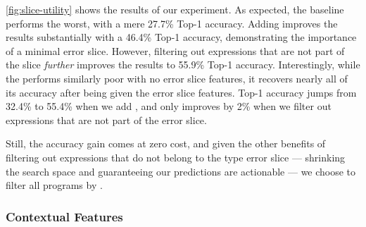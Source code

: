 \autoref{fig:slice-utility} shows the results of our experiment.
%
As expected, the baseline performs the worst, with a mere 27.7\% \linear
Top-1 accuracy.
%
Adding \InSlice improves the results substantially with a 46.4\% \linear Top-1
accuracy, demonstrating the importance of a minimal error slice.
%
However, filtering out expressions that are not part of the slice
\emph{further} improves the results to 55.9\% \linear Top-1 accuracy.
%
Interestingly, while the \hiddenFH performs similarly poor with no error
slice features, it recovers nearly all of its accuracy after being given
the error slice features.
%
Top-1 accuracy jumps from 32.4\% to 55.4\% when we add \InSlice, and only
improves by 2\% when we filter out expressions that are not part of the
error slice.

Still, the accuracy gain comes at zero cost, and given the other benefits
of filtering out expressions that do not belong to the type error slice
--- shrinking the search space and guaranteeing our predictions are actionable ---
we choose to filter all programs by \InSlice.

\subsubsection{Contextual Features}
\label{sec:contextual-features}

